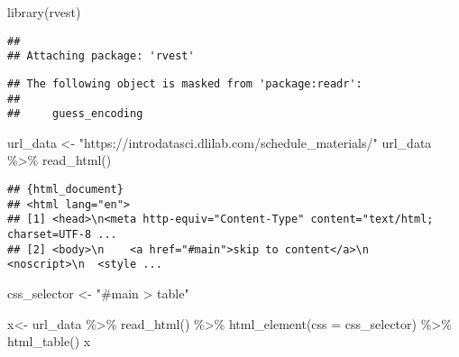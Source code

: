 \documentclass[
]{article}
\newenvironment{Shaded}{\begin{snugshade}}{\end{snugshade}}
\newcommand{\AttributeTok}[1]{\textcolor[rgb]{0.77,0.63,0.00}{#1}}
\newcommand{\FunctionTok}[1]{\textcolor[rgb]{0.00,0.00,0.00}{#1}}
\newcommand{\NormalTok}[1]{#1}
\newcommand{\OtherTok}[1]{\textcolor[rgb]{0.56,0.35,0.01}{#1}}
\newcommand{\SpecialCharTok}[1]{\textcolor[rgb]{0.00,0.00,0.00}{#1}}
\newcommand{\StringTok}[1]{\textcolor[rgb]{0.31,0.60,0.02}{#1}}
\begin{document}
\begin{Shaded}
\begin{Highlighting}[]
\FunctionTok{library}\NormalTok{(rvest)}
\end{Highlighting}
\end{Shaded}

\begin{verbatim}
## 
## Attaching package: 'rvest'
\end{verbatim}

\begin{verbatim}
## The following object is masked from 'package:readr':
## 
##     guess_encoding
\end{verbatim}

\begin{Shaded}
\begin{Highlighting}[]
\NormalTok{url\_data }\OtherTok{\textless{}{-}} \StringTok{"https://introdatasci.dlilab.com/schedule\_materials/"}
\NormalTok{url\_data }\SpecialCharTok{\%\textgreater{}\%} 
  \FunctionTok{read\_html}\NormalTok{()}
\end{Highlighting}
\end{Shaded}

\begin{verbatim}
## {html_document}
## <html lang="en">
## [1] <head>\n<meta http-equiv="Content-Type" content="text/html; charset=UTF-8 ...
## [2] <body>\n    <a href="#main">skip to content</a>\n    <noscript>\n  <style ...
\end{verbatim}

\begin{Shaded}
\begin{Highlighting}[]
\NormalTok{css\_selector }\OtherTok{\textless{}{-}} \StringTok{"\#main \textgreater{} table"}
\end{Highlighting}
\end{Shaded}

\begin{Shaded}
\begin{Highlighting}[]
\NormalTok{x}\OtherTok{\textless{}{-}}\NormalTok{ url\_data }\SpecialCharTok{\%\textgreater{}\%} 
  \FunctionTok{read\_html}\NormalTok{() }\SpecialCharTok{\%\textgreater{}\%} 
  \FunctionTok{html\_element}\NormalTok{(}\AttributeTok{css =}\NormalTok{ css\_selector) }\SpecialCharTok{\%\textgreater{}\%} 
  \FunctionTok{html\_table}\NormalTok{()}
\NormalTok{x}
\end{Highlighting}
\end{Shaded}
\end{document}
